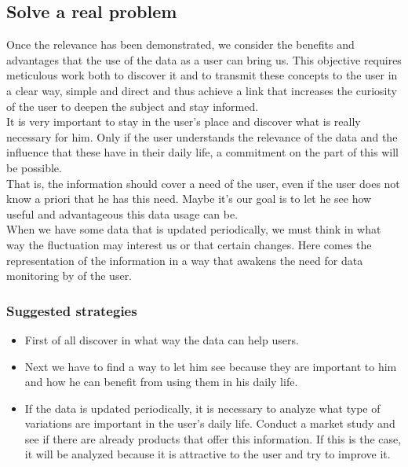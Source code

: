 \subsection{Solve a real problem}

Once the relevance has been demonstrated, we consider the benefits and advantages that the use of the data as a user can bring us.
This objective requires meticulous work both to discover it and to transmit these concepts to the user in a clear way,
simple and direct and thus achieve a link that increases the curiosity of the user to deepen the subject and stay informed.\\

It is very important to stay in the user's place and discover what is really necessary for him.
Only if the user understands the relevance of the data and the influence that these have in their daily life, a commitment on the part of this will be possible.\\

That is, the information should cover a need of the user, even if the user does not know a priori that he has this need.
Maybe it's our goal is to let he see how useful and advantageous this data usage can be.\\

When we have some data that is updated periodically, we must think in what way the fluctuation may interest us or that certain changes.
Here comes the representation of the information in a way that awakens the need for data monitoring by of the user.

\subsubsection*{Suggested strategies} 

\begin{itemize}
    \item First of all discover in what way the data can help users.
    \item Next we have to find a way to let him see because they are important to him and how he can benefit from using them in his daily life.
    \item If the data is updated periodically, it is necessary to analyze what type of variations are important in the user's daily life.
    Conduct a market study and see if there are already products that offer this information.
    If this is the case, it will be analyzed because it is attractive to the user and try to improve it.
\end{itemize}

